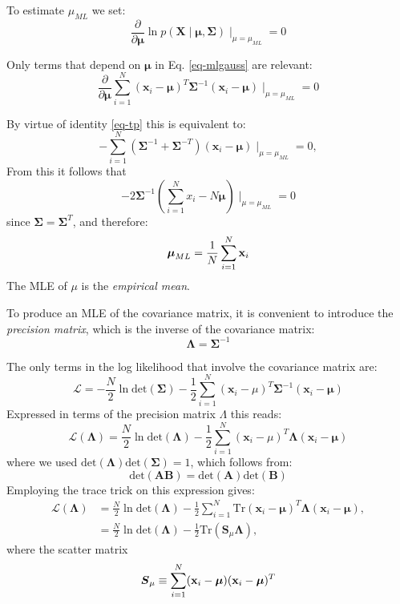     
  To estimate $\mu_{ML}$ we set:
  $$
  \frac{\partial}{\partial \boldsymbol{\mu} }\ln p(\boldsymbol{X} \mid \boldsymbol{\mu, \Sigma}) \mid_{\mu = \mu_{ML}} = 0
  $$
  
  Only terms that depend on $\boldsymbol{\mu}$ in Eq. \ref{eq-mlgauss}  are relevant:
  $$
  \frac{\partial}{\partial \boldsymbol{\mu}} \sum^N_{i=1}(\boldsymbol{x}_i - \boldsymbol{\mu})^T \boldsymbol{\Sigma}^{-1} (\boldsymbol{x}_i - \boldsymbol{\mu}) \mid_{\mu = \mu_{ML}} = 0
  $$

  By virtue of identity \ref{eq-tp} this is equivalent to:
  $$
   -\sum^N_{i=1} (\boldsymbol{\Sigma}^{-1} + {\boldsymbol{\Sigma}^{-T}})(\boldsymbol{x}_i - \boldsymbol{\mu}) \mid_{\mu = \mu_{ML}} = 0,
  $$
   From this it follows that
   $$
   -2 \boldsymbol{\Sigma}^{-1}( \sum^N_{i=1} x_i - N \boldsymbol{\mu}) \mid_{\mu = \mu_{ML}} = 0
   $$
   since $\boldsymbol{\Sigma} = \boldsymbol{\Sigma}^T$, and therefore:
   \begin{equation}
     \boldsymbol{\mu}_{ML} = \frac{1}{N} \sum^N_{i=1} {\bf x}_i
     \label{eq-multivarMLE1}
   \end{equation}
   The MLE of $\mu$ is the \emph{empirical mean}.

   To produce an MLE of the covariance matrix, it is convenient to introduce the \emph{precision matrix}, which is the inverse of
   the covariance matrix:
   \begin{equation}
     \boldsymbol{\Lambda} = \boldsymbol{\Sigma}^{-1}
   \end{equation}

   The only terms in the log likelihood that involve the covariance matrix
   are:
   $$
   \mathcal{L} = - \frac{N}{2} \ln \mbox{det}(\boldsymbol{\Sigma}) - \frac{1}{2} \sum^N_{i=1}(\boldsymbol{x}_i - \mu)^T \boldsymbol{\Sigma}^{-1}(\boldsymbol{x}_i - \boldsymbol{\mu})
   $$
   Expressed in terms of the precision matrix $\Lambda$ this reads:
   \begin{equation}
   \mathcal{L}(\boldsymbol{\Lambda}) = \frac{N}{2} \ln \mbox{det}(\boldsymbol{\Lambda}) - \frac{1}{2}  \sum^N_{i=1}(\boldsymbol{x}_i - \mu)^T \boldsymbol{\Lambda}(\boldsymbol{x}_i - \boldsymbol{\mu})
   \end{equation}
   where we used $\mbox{det}(\boldsymbol{\Lambda}) \mbox{det}(\boldsymbol{\Sigma}) = 1$, which follows from:
   $$
   \mbox{det}(\boldsymbol{AB}) = \mbox{det}(\boldsymbol{A})\mbox{det}(\boldsymbol{B})
   $$
   Employing the trace trick on this expression gives:
   \begin{align}
     \mathcal{L}(\boldsymbol{\Lambda}) & = \frac{N}{2} \ln \mbox{det}(\boldsymbol{\Lambda}) - \frac{1}{2}  \sum^N_{i=1}\mbox{Tr}(\boldsymbol{x}_i - \boldsymbol{\mu})^T \boldsymbol{\Lambda}(\boldsymbol{x}_i - \boldsymbol{\mu}),\nonumber \\
                          & = \frac{N}{2} \ln \mbox{det}(\boldsymbol{\Lambda}) - \frac{1}{2} \mbox{Tr}(\boldsymbol{S}_{\mu} \boldsymbol{\Lambda}),
   \end{align}
   where the scatter matrix
   \begin{equation}
     \boldsymbol{S}_{\mu} \equiv  \sum^N_{i=1}({\bf x}_i - {\boldsymbol{\mu}})({\bf x}_i - \boldsymbol{\mu})^T
   \end{equation}

